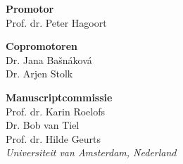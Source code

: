 {\setlength{\parindent}{0cm}\raggedright%

\newpage

\hspace{-12pt}\textbf{Promotor}\\
Prof. dr. Peter Hagoort
\vspace{12pt}

\hspace{-12pt}\textbf{Copromotoren}\\
Dr. Jana Ba\v{s}n\'{a}kov\'{a} \\
Dr. Arjen Stolk
\vspace{20pt}

\hspace{-12pt}\textbf{Manuscriptcommissie}\\
Prof. dr. Karin Roelofs\\

\vspace{6pt}
Dr. Bob van Tiel\\

\vspace{6pt}
Prof. dr. Hilde Geurts\\
\emph{Universiteit van Amsterdam, Nederland}\\

\vfill
}



\thispagestyle{empty}

{\setlength{\parindent}{0cm}
\begin{flushright}
\end{flushright}
}

